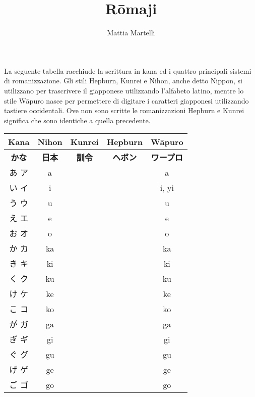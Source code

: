 \documentclass{article}
\title{R\={o}maji}
\author{Mattia Martelli}
\date{}
\begin{document}
    \maketitle

    La seguente tabella racchiude la scrittura in kana ed i quattro principali sistemi di romanizzazione. Gli stili
    Hepburn, Kunrei e Nihon, anche detto Nippon, si utilizzano per trascrivere il giapponese utilizzando l'alfabeto
    latino, mentre lo stile W\={a}puro nasce per permettere di digitare i caratteri giapponesi utilizzando tastiere
    occidentali. Ove non sono scritte le romanizzazioni Hepburn e Kunrei significa che sono identiche a quella
    precedente.

        \begin{center}
            \begin{japanese}
            \begin{longtable}{|c|c c c|c|}
                \hline
                \textitalian{\textbf{Kana}} & \textitalian{\textbf{Nihon}} & \textitalian{\textbf{Kunrei}} & \textitalian{\textbf{Hepburn}} & \textitalian{\textbf{Wāpuro}} \\ \hline
                \textbf{かな} & \textbf{日本} & \textbf{訓令} & \textbf{ヘボン} & \textbf{ワープロ} \\ \hline\hline
                あ ア & a &&& a \\ \hline
                い イ & i &&& i, yi \\ \hline
                う ウ & u &&& u \\ \hline
                え エ & e &&& e \\ \hline
                お オ & o &&& o \\ \hline
                か カ & ka &&& ka \\ \hline
                き キ & ki &&& ki \\ \hline
                く ク & ku &&& ku \\ \hline
                け ケ & ke &&& ke \\ \hline
                こ コ & ko &&& ko \\ \hline
                が ガ & ga &&& ga \\ \hline
                ぎ ギ & gi &&& gi \\ \hline
                ぐ グ & gu &&& gu \\ \hline
                げ ゲ & ge &&& ge \\ \hline
                ご ゴ & go &&& go \\ \hline

\end{longtable}
\end{japanese}
\end{center}
\end{document}
